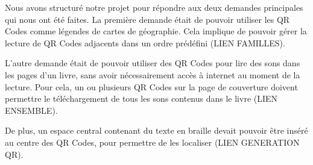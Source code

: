 \par
Nous avons structuré notre projet pour répondre aux deux demandes principales qui nous ont été faites. La première demande était de pouvoir utiliser les QR Codes comme légendes de cartes de géographie. Cela implique de pouvoir gérer la lecture de QR Codes adjacents dans un ordre prédéfini (LIEN FAMILLES).\\

\par
L'autre demande était de pouvoir utiliser des QR Codes pour lire des sons dans les pages d'un livre, sans avoir nécessairement accès à internet au moment de la lecture. Pour cela, un ou plusieurs QR Codes sur la page de couverture doivent permettre le téléchargement de tous les sons contenus dans le livre (LIEN ENSEMBLE).\\

\par
De plus, un espace central contenant du texte en braille devait pouvoir être inséré au centre des QR Codes, pour permettre de les localiser (LIEN GENERATION QR).